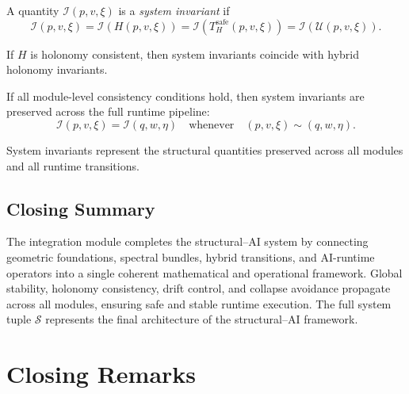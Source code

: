 \documentclass[11pt]{article}
\begin{document}
\begin{definition}
A quantity $\mathcal{I}(p,v,\xi)$ is a \emph{system invariant} if
\[
\mathcal{I}(p,v,\xi)
= \mathcal{I}(H(p,v,\xi))
= \mathcal{I}(T_H^\mathrm{safe}(p,v,\xi))
= \mathcal{I}(\mathcal{U}(p,v,\xi)).
\]
\end{definition}

\begin{lemma}
If $H$ is holonomy consistent, then system invariants coincide with hybrid
holonomy invariants.
\end{lemma}

\begin{theorem}
If all module-level consistency conditions hold, then system invariants are
preserved across the full runtime pipeline:
\[
\mathcal{I}(p,v,\xi)
= \mathcal{I}(q,w,\eta)
\quad\text{whenever}\quad
(p,v,\xi) \sim (q,w,\eta).
\]
\end{theorem}

\begin{remark}
System invariants represent the structural quantities preserved across all
modules and all runtime transitions.
\end{remark}

\subsection{Closing Summary}

\begin{remark}
The integration module completes the structural--AI system by connecting
geometric foundations, spectral bundles, hybrid transitions, and AI-runtime
operators into a single coherent mathematical and operational framework.
Global stability, holonomy consistency, drift control, and collapse
avoidance propagate across all modules, ensuring safe and stable runtime
execution. The full system tuple $\mathcal{S}$ represents the final
architecture of the structural--AI framework.
\end{remark}

\section{Closing Remarks}
\end{document}
